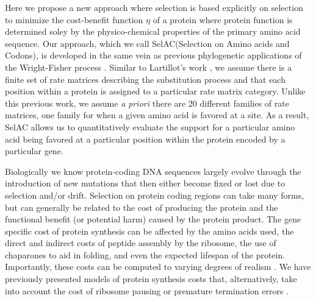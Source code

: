 \documentclass[12pt,letterpaper]{article}
\newcommand{\PC}{physico-chemical\xspace}
\newcommand{\selac}{SelAC\xspace}
\begin{document}
Here we propose a new approach where selection is based explicitly on selection to minimize the cost-benefit function $\eta$ of a protein where protein function is determined soley by the \PC properties of the primary amino acid sequence.
Our approach, which we call \selac (Selection on Amino acids and Codons), is developed in the same vein as previous phylogenetic applications of the Wright-Fisher process \citep[e.g.~][]{MuseAndGaut1994,HalpernAndBruno1998,YangAndNielsen2008,RodrigueEtAl2005,KoshiAndGoldstein1997,KoshiEtAl1999,DimmicEtAl2000,ThorneEtAl2012,LartillotAndPhilippe2004,RodrigueAndLartillot2014}.
Similar to Lartillot's work \citep{LartillotAndPhilippe2004,RodrigueAndLartillot2014}, we assume there is a finite set of rate matrices describing the substitution process and that each position within a protein is assigned to a particular rate matrix category.
Unlike this previous work, we assume \emph{a priori} there are 20 different families of rate matrices, one family for when a given amino acid is favored at a site.
As a result, \selac allows us to quantitatively evaluate the support for a particular amino acid being favored at a particular position within the protein encoded by a particular gene.

Biologically we know protein-coding DNA sequences largely evolve through the introduction of new  mutations that then either become fixed or lost due to selection and/or drift.
Selection on protein coding regions can take many forms, but can generally be related to the cost of producing the protein and the functional benefit (or potential harm) caused by the protein product.
The gene specific cost of protein synthesis can be affected by the amino acids used, the direct and indirect costs of peptide assembly by the ribosome, the use of chaparones to aid in folding, and even the expected lifespan of the protein.
Importantly, these costs can be computed to varying degrees of realism \citep[e.g.][]{Wagner2005,LynchAndMarinov2015}.
We have previously presented models of protein synthesis costs that, alternatively, take into account the cost of ribosome pausing \citep{ShahAndGilchrist2011} or premature termination errors \citep{GilchristAndWagner2006,Gilchrist2007,GilchristEtAl2009}.
\end{document}
